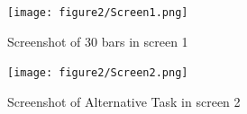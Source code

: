 \begin{figure}[H]
 \captionsetup{justification=raggedright,singlelinecheck=false}
\caption{Screenshot of 30 bars in screen 1  }
\texttt{[image: figure2/Screen1.png]} 
\end{figure}

\begin{figure}[H]
 \captionsetup{justification=raggedright,singlelinecheck=false}
\caption{Screenshot of Alternative Task in screen 2  }
\texttt{[image: figure2/Screen2.png]} 
\end{figure}
% 